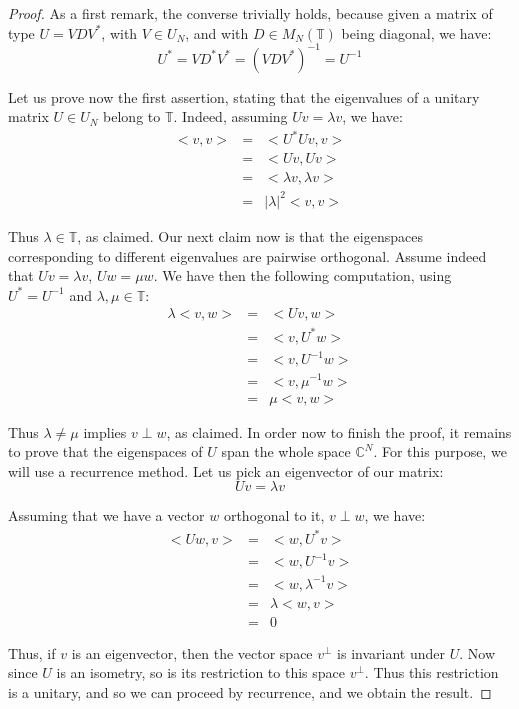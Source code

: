 \documentclass[12pt]{amsbook}
\begin{document}
\begin{proof}
As a first remark, the converse trivially holds, because given a matrix of type $U=VDV^*$, with $V\in U_N$, and with $D\in M_N(\mathbb T)$ being diagonal, we have:
$$U^*
=VD^*V^*
=(VDV^*)^{-1}
=U^{-1}$$

Let us prove now the first assertion, stating that the eigenvalues of a unitary matrix $U\in U_N$ belong to $\mathbb T$. Indeed, assuming $Uv=\lambda v$, we have:
\begin{eqnarray*}
<v,v>
&=&<U^*Uv,v>\\
&=&<Uv,Uv>\\
&=&<\lambda v,\lambda v>\\
&=&|\lambda|^2<v,v>
\end{eqnarray*}

Thus $\lambda\in\mathbb T$, as claimed. Our next claim now is that the eigenspaces corresponding to different eigenvalues are pairwise orthogonal. Assume indeed that $Uv=\lambda v$, $Uw=\mu w$. We have then the following computation, using $U^*=U^{-1}$ and $\lambda,\mu\in\mathbb T$:
\begin{eqnarray*}
\lambda<v,w>
&=&<Uv,w>\\
&=&<v,U^*w>\\
&=&<v,U^{-1}w>\\
&=&<v,\mu^{-1}w>\\
&=&\mu<v,w>
\end{eqnarray*}

Thus $\lambda\neq\mu$ implies $v\perp w$, as claimed. In order now to finish the proof, it remains to prove that the eigenspaces of $U$ span the whole space $\mathbb C^N$. For this purpose, we will use a recurrence method. Let us pick an eigenvector of our matrix:
$$Uv=\lambda v$$

Assuming that we have a vector $w$ orthogonal to it, $v\perp w$, we have:
\begin{eqnarray*}
<Uw,v>
&=&<w,U^*v>\\
&=&<w,U^{-1}v>\\
&=&<w,\lambda^{-1}v>\\
&=&\lambda<w,v>\\
&=&0
\end{eqnarray*}

Thus, if $v$ is an eigenvector, then the vector space $v^\perp$ is invariant under $U$. Now since $U$ is an isometry, so is its restriction to this space $v^\perp$. Thus this restriction is a unitary, and so we can proceed by recurrence, and we obtain the result.
\end{proof}
\end{document}
